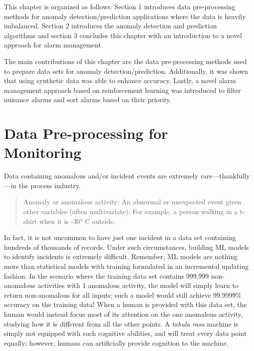 This chapter is organized as follows: Section 1 introduces data pre-processing methods for anomaly detection/prediction applications where the data is heavily imbalanced.  Section 2 introduces the anomaly detection and prediction algorithms and section 3 concludes this chapter with an introduction to a novel approach for alarm management.

The main contributions of this chapter are the data pre-processing methods used to prepare data sets for anomaly detection/prediction.  Additionally, it was shown that using synthetic data was able to enhance accuracy.  Lastly, a novel alarm management approach based on reinforcement learning was introduced to filter nuisance alarms and sort alarms based on their priority.  


\section{Data Pre-processing for Monitoring}
Data containing anomalous and/or incident events are extremely rare---thankfully---in the process industry. \begin{quote}
    Anomaly or anomalous activity: An abnormal or unexpected event given other variables (often multivariate).  For example, a person walking in a t-shirt when it is -$\ang{30}$ C outside.
\end{quote}

In fact, it is not uncommon to have just one incident in a data set containing hundreds of thousands of records.  Under such circumstances, building ML models to identify incidents is extremely difficult.  Remember, ML models are nothing more than statistical models with training formulated in an incremental updating fashion. In the scenario where the training data set contains 999,999 non-anomalous activities with 1 anomalous activity, the model will simply learn to return non-anomalous for all inputs; such a model would still achieve 99.9999\% accuracy on the training data!  When a human is provided with this data set, the human would instead focus most of its attention on the one anomalous activity, studying how it is different from all the other points.  A \textit{tabula rasa} machine is simply not equipped with such cognitive abilities, and will treat every data point equally; however, humans can artificially provide cognition to the machine.

